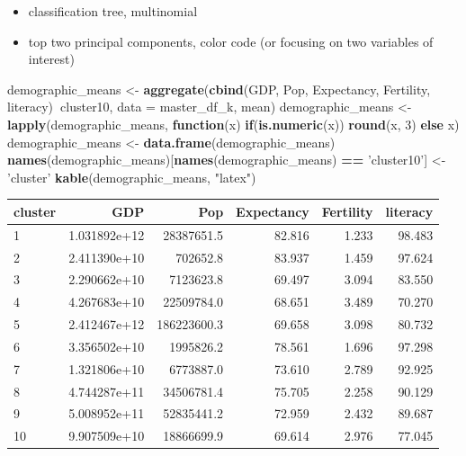 \documentclass[]{article}
\newenvironment{Shaded}{\begin{snugshade}}{\end{snugshade}}
\newcommand{\ControlFlowTok}[1]{\textcolor[rgb]{0.13,0.29,0.53}{\textbf{#1}}}
\newcommand{\DataTypeTok}[1]{\textcolor[rgb]{0.13,0.29,0.53}{#1}}
\newcommand{\DecValTok}[1]{\textcolor[rgb]{0.00,0.00,0.81}{#1}}
\newcommand{\KeywordTok}[1]{\textcolor[rgb]{0.13,0.29,0.53}{\textbf{#1}}}
\newcommand{\NormalTok}[1]{#1}
\newcommand{\OperatorTok}[1]{\textcolor[rgb]{0.81,0.36,0.00}{\textbf{#1}}}
\newcommand{\StringTok}[1]{\textcolor[rgb]{0.31,0.60,0.02}{#1}}
\providecommand{\tightlist}{%
  \setlength{\itemsep}{0pt}\setlength{\parskip}{0pt}}
\begin{document}
\begin{itemize}
\tightlist
\item
  classification tree, multinomial
\item
  top two principal components, color code (or focusing on two variables
  of interest)
\end{itemize}

\begin{Shaded}
\begin{Highlighting}[]
\NormalTok{demographic_means <-}\StringTok{ }\KeywordTok{aggregate}\NormalTok{(}\KeywordTok{cbind}\NormalTok{(GDP, Pop, Expectancy, Fertility, literacy)}\OperatorTok{~}\NormalTok{cluster10, }
                               \DataTypeTok{data =}\NormalTok{ master_df_k, mean)}
\NormalTok{demographic_means <-}\StringTok{ }\KeywordTok{lapply}\NormalTok{(demographic_means, }\ControlFlowTok{function}\NormalTok{(x) }\ControlFlowTok{if}\NormalTok{(}\KeywordTok{is.numeric}\NormalTok{(x)) }\KeywordTok{round}\NormalTok{(x, }\DecValTok{3}\NormalTok{) }\ControlFlowTok{else}\NormalTok{ x)}
\NormalTok{demographic_means <-}\StringTok{ }\KeywordTok{data.frame}\NormalTok{(demographic_means)}
\KeywordTok{names}\NormalTok{(demographic_means)[}\KeywordTok{names}\NormalTok{(demographic_means) }\OperatorTok{==}\StringTok{ 'cluster10'}\NormalTok{] <-}\StringTok{ 'cluster'}
\KeywordTok{kable}\NormalTok{(demographic_means, }\StringTok{"latex"}\NormalTok{)}
\end{Highlighting}
\end{Shaded}

\begin{tabular}{l|r|r|r|r|r}
\hline
cluster & GDP & Pop & Expectancy & Fertility & literacy\\
\hline
1 & 1.031892e+12 & 28387651.5 & 82.816 & 1.233 & 98.483\\
\hline
2 & 2.411390e+10 & 702652.8 & 83.937 & 1.459 & 97.624\\
\hline
3 & 2.290662e+10 & 7123623.8 & 69.497 & 3.094 & 83.550\\
\hline
4 & 4.267683e+10 & 22509784.0 & 68.651 & 3.489 & 70.270\\
\hline
5 & 2.412467e+12 & 186223600.3 & 69.658 & 3.098 & 80.732\\
\hline
6 & 3.356502e+10 & 1995826.2 & 78.561 & 1.696 & 97.298\\
\hline
7 & 1.321806e+10 & 6773887.0 & 73.610 & 2.789 & 92.925\\
\hline
8 & 4.744287e+11 & 34506781.4 & 75.705 & 2.258 & 90.129\\
\hline
9 & 5.008952e+11 & 52835441.2 & 72.959 & 2.432 & 89.687\\
\hline
10 & 9.907509e+10 & 18866699.9 & 69.614 & 2.976 & 77.045\\
\hline
\end{tabular}
\end{document}
